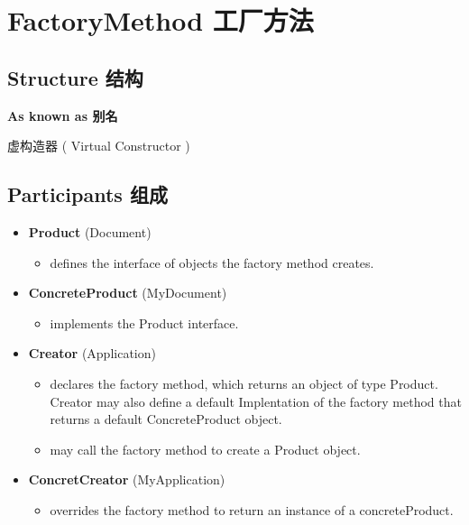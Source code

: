 \section{FactoryMethod 工厂方法}

\subsection{Structure 结构}


\textbf{ As known as 别名 }

虚构造器 ( Virtual Constructor )

\subsection{Participants 组成}

\begin{itemize}
\small

\item \textbf{Product} (Document)
	\begin{itemize}
		\item defines the interface of objects the factory method creates.
	\end{itemize}

\item \textbf{ConcreteProduct} (MyDocument)
	\begin{itemize}
		\item implements the Product interface.
	\end{itemize}

\item \textbf{Creator} (Application)
	\begin{itemize} 
		\item declares the factory method, which returns an object of type Product. Creator may also define a default Implentation of the factory method that returns a default ConcreteProduct object.

		\item may call the factory method to create a Product object.
	\end{itemize}

\item \textbf{ConcretCreator} (MyApplication)
	\begin{itemize}
		\item overrides the factory method to return an instance of a concreteProduct.
	\end{itemize}

\normalize
\end{itemize}

